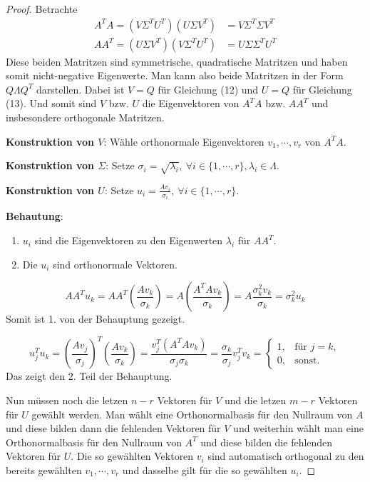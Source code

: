 \documentclass{article}
\begin{document}
\begin{proof}
    Betrachte
    \begin{align}
        A^TA = (V \Sigma^T U^T) (U \Sigma V^T) &= V \Sigma^T \Sigma V^T \\
        AA^T = (U \Sigma V^T) (V \Sigma^T U^T) &= U \Sigma \Sigma^T U^T
    \end{align}
    Diese beiden Matritzen sind symmetrische, quadratische Matritzen und haben somit
    nicht-negative Eigenwerte. Man kann also beide Matritzen in der Form $Q \Lambda Q^T$ darstellen.
    Dabei ist $V = Q$ für Gleichung (12) und $U = Q$ für Gleichung (13). Und somit sind $V$ bzw. $U$ die Eigenvektoren
    von $A^TA$ bzw. $AA^T$ und insbesondere orthogonale Matritzen.

    \textbf{Konstruktion von $V$}: Wähle orthonormale Eigenvektoren $v_1, \cdots, v_r$ von $A^TA$.

    \textbf{Konstruktion von $\Sigma$}: Setze $\sigma_i = \sqrt{\lambda_i}, \: \forall i \in \{1, \cdots, r\}, \lambda_i \in \Lambda$.

    \textbf{Konstruktion von $U$}: Setze $u_i = \frac{Av_i}{\sigma_i}, \: \forall i \in \{1, \cdots, r\}$.
    
    \textbf{Behautung}: 
    \begin{enumerate}
        \item $u_i$ sind die Eigenvektoren zu den Eigenwerten $\lambda_i$ für $AA^T$.
        \item Die $u_i$ sind orthonormale Vektoren.
    \end{enumerate}
    \begin{equation*}
        AA^Tu_k = AA^T\left(\frac{Av_k}{\sigma_k}\right) = A\left(\frac{A^TAv_k}{\sigma_k}\right) = A\frac{\sigma_k^2v_k}{\sigma_k} = \sigma_k^2u_k
    \end{equation*}
    Somit ist 1. von der Behauptung gezeigt.

    \begin{equation*}
        u_j^Tu_k = \left(\frac{Av_j}{\sigma_j}\right)^T\left(\frac{Av_k}{\sigma_k}\right) = \frac{v_j^T(A^TAv_k)}{\sigma_j\sigma_k} = \frac{\sigma_k}{\sigma_j}v_j^Tv_k = \begin{cases}
            1, &\text{für } j = k,\\
            0, &\text{sonst}.
        \end{cases}
    \end{equation*}
    Das zeigt den 2. Teil der Behauptung.

    Nun müssen noch die letzen $n - r$ Vektoren für $V$ und die letzen $m - r$ Vektoren für $U$ gewählt werden.
    Man wählt eine Orthonormalbasis für den Nullraum von $A$ und diese bilden dann die fehlenden Vektoren für $V$ 
    und weiterhin wählt man eine Orthonormalbasis für den Nullraum von $A^T$ und diese bilden die fehlenden Vektoren für $U$.
    Die so gewählten Vektoren $v_i$ sind automatisch orthogonal zu den bereits gewählten $v_1, \cdots, v_r$ 
    und dasselbe gilt für die so gewählten $u_i$. 
\end{proof}
\end{document}
